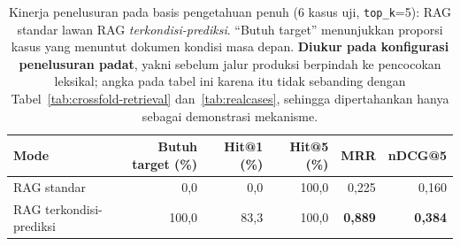 \begin{table}[htbp]
\centering
\caption{Kinerja penelusuran pada basis pengetahuan penuh (6 kasus uji, \texttt{top\_\allowbreak k}=5): RAG standar lawan RAG \emph{terkondisi-prediksi}. ``Butuh target'' menunjukkan proporsi kasus yang menuntut dokumen kondisi masa depan. \textbf{Diukur pada konfigurasi penelusuran padat}, yakni sebelum jalur produksi berpindah ke pencocokan leksikal; angka pada tabel ini karena itu tidak sebanding dengan Tabel~\ref{tab:crossfold-retrieval} dan~\ref{tab:realcases}, sehingga dipertahankan hanya sebagai demonstrasi mekanisme.}
\label{tab:kinerja-retrieval}
\small
\begin{tabular}{@{}lrrrrr@{}}
\toprule
\textbf{Mode} & \textbf{Butuh target (\%)} & \textbf{Hit@1 (\%)} & \textbf{Hit@5 (\%)} & \textbf{MRR} & \textbf{nDCG@5} \\
\midrule
RAG standar & 0,0 & 0,0 & 100,0 & 0,225 & 0,160 \\
RAG terkondisi-prediksi & 100,0 & 83,3 & 100,0 & \textbf{0,889} & \textbf{0,384} \\
\bottomrule
\end{tabular}
\end{table}
